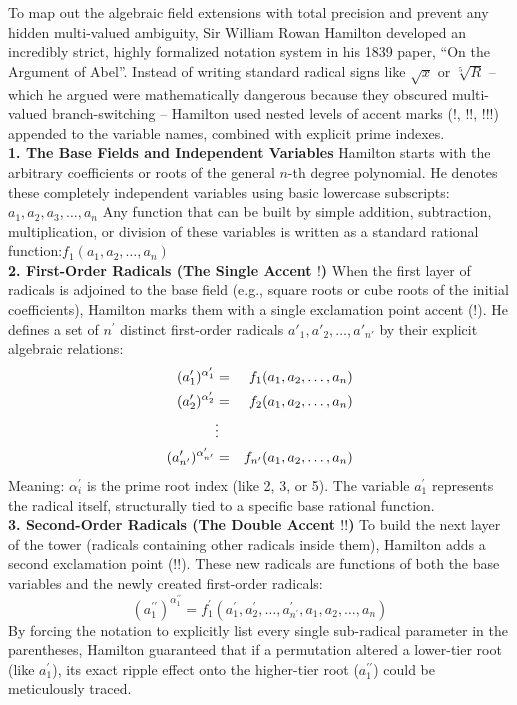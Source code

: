 To map out the algebraic field extensions with total precision and prevent any hidden multi-valued ambiguity, Sir William Rowan Hamilton developed an incredibly strict,
highly formalized notation system in his 1839 paper, ``On the Argument of Abel''.
Instead of writing standard radical signs like \(\sqrt{x}\) or \(\sqrt[5]{R}\)
-- which he argued were mathematically dangerous because they obscured multi-valued branch-switching -- Hamilton used nested levels of accent marks (\(!\), \(!!\), \(!!!\)) appended to the variable names, combined with explicit prime indexes.\\

{\bf 1. The Base Fields and Independent Variables}
Hamilton starts with the arbitrary coefficients or roots of the general \(n\)-th degree polynomial. 
He denotes these completely independent variables using basic lowercase subscripts: \(a_{1},a_{2},a_{3},\dots ,a_{n}\) 
Any function that can be built by simple addition, subtraction, multiplication, or division of these variables is written as a standard rational function:\(f_{1}(a_{1},a_{2},\dots ,a_{n})\)\\ 

{\bf 2. First-Order Radicals (The Single Accent \(!\))}
When the first layer of radicals is adjoined to the base field (e.g., square roots or cube roots of the initial coefficients), Hamilton marks them with a single exclamation point accent (\(!\)).
He defines a set of \(n^{\prime }\) distinct first-order radicals \(a'_1, a'_2, \dots, a'_{n'}\) by their explicit algebraic relations:
\begin{eqnarray*}
(a_{1}^{\prime })^{\alpha _{1}^{\prime }} &=& f_{1}(a_{1},a_{2},\dots ,a_{n}) \cr
(a_{2}^{\prime })^{\alpha _{2}^{\prime }} &=& f_{2}(a_{1},a_{2},\dots ,a_{n}) \cr
&\vdots& \cr
 (a_{n^{\prime }}^{\prime })^{\alpha _{n^{\prime }}^{\prime }} &=& f_{n^{\prime }}(a_{1},a_{2},\dots ,a_{n})
\end{eqnarray*}
Meaning: \(\alpha _{i}^{\prime }\) is the prime root index (like 2, 3, or 5). The variable \(a_{1}^{\prime }\) represents the radical itself, structurally tied to a specific base rational function.\\ 

{\bf 3. Second-Order Radicals (The Double Accent \(!!\))} 
To build the next layer of the tower (radicals containing other radicals inside them), Hamilton adds a second exclamation point (\(!!\)).
These new radicals are functions of both the base variables and the newly created first-order radicals:
\[(a_{1}^{\prime \prime })^{\alpha _{1}^{\prime \prime }}=f_{1}^{\prime }(a_{1}^{\prime },a_{2}^{\prime },\dots ,a_{n^{\prime }}^{\prime },a_{1},a_{2},\dots ,a_{n})\]
By forcing the notation to explicitly list every single sub-radical parameter in the parentheses, Hamilton guaranteed that if a permutation altered a lower-tier root (like \(a_{1}^{\prime }\)),
its exact ripple effect onto the higher-tier root (\(a_{1}^{\prime \prime }\)) could be meticulously traced.\\ 

